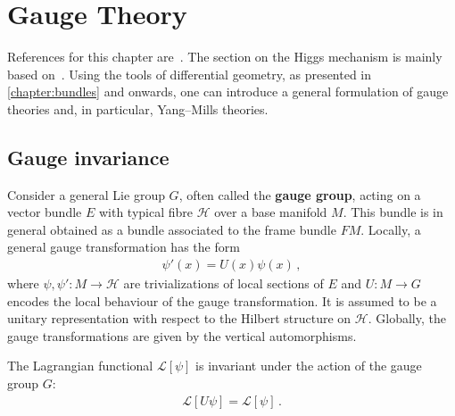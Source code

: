 \chapter{Gauge Theory}\label{chapter:gauge_theory}

    References for this chapter are~\citet{sontz_principal_2015,schuller_lectures_2016,nash_topology_2011,belgun_gauge_2024}. The section on the Higgs mechanism is mainly based on~\citet{choquet-bruhat_analysis_2000}. Using the tools of differential geometry, as presented in \cref{chapter:bundles} and onwards, one can introduce a general formulation of gauge theories and, in particular, Yang--Mills theories.

\section{Gauge invariance}

    Consider a general Lie group $G$, often called the \textbf{gauge group}, acting on a vector bundle $E$ with typical fibre $\mathcal{H}$ over a base manifold $M$. This bundle is in general obtained as a bundle associated  to the frame bundle $FM$. Locally, a general gauge transformation has the form
    \begin{gather}
        \label{gauge:gauge_transformation}
        \psi'(x) = U(x)\psi(x)\,,
    \end{gather}
    where $\psi,\psi':M\rightarrow\mathcal{H}$ are trivializations of local sections of $E$ and $U:M\rightarrow G$ encodes the local behaviour of the gauge transformation. It is assumed to be a unitary representation with respect to the Hilbert structure on $\mathcal{H}$. Globally, the gauge transformations are given by the vertical automorphisms.

    \begin{axiom}
        The Lagrangian functional $\mathcal{L}[\psi]$ is invariant under the action of the gauge group $G$:
        \begin{gather}
            \mathcal{L}[U\psi] = \mathcal{L}[\psi]\,.
        \end{gather}
    \end{axiom}

